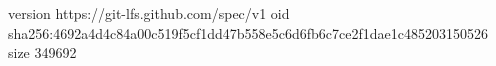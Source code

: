 version https://git-lfs.github.com/spec/v1
oid sha256:4692a4d4c84a00c519f5cf1dd47b558e5c6d6fb6c7ce2f1dae1c485203150526
size 349692
